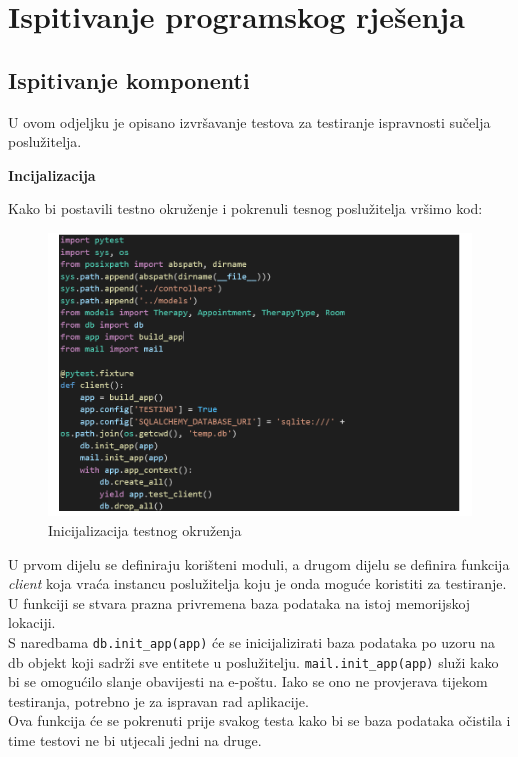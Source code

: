 	
		\section{Ispitivanje programskog rješenja}
			
			\subsection{Ispitivanje komponenti}
			
			U ovom odjeljku je opisano izvršavanje testova za testiranje ispravnosti sučelja poslužitelja. 
			
			
			\textbf{Incijalizacija}
			
			
			Kako bi postavili testno okruženje i pokrenuli tesnog poslužitelja vršimo kod:
			
			\begin{figure}[H]
				\includegraphics[scale=0.3]{slike/testno_okruzenje.PNG} %
				\centering
				\caption{Inicijalizacija testnog okruženja}
				\label{fig:testno_okruzenje}
			\end{figure}
			
			U prvom dijelu se definiraju korišteni moduli, a drugom dijelu se definira funkcija \textit{client} koja vraća instancu poslužitelja koju je onda moguće koristiti za testiranje. U funkciji se stvara prazna privremena baza podataka na istoj memorijskoj lokaciji. \\
S naredbama \texttt{db.init\_app(app)} će se inicijalizirati baza podataka po uzoru na db objekt koji sadrži sve entitete u poslužitelju. \texttt{mail.init\_app(app)} služi kako bi se omogućilo slanje obavijesti na e-poštu. Iako se ono ne provjerava tijekom testiranja, potrebno je za ispravan rad aplikacije. \\
Ova funkcija će se pokrenuti prije svakog testa kako bi se baza podataka očistila i time testovi ne bi utjecali jedni na druge.


